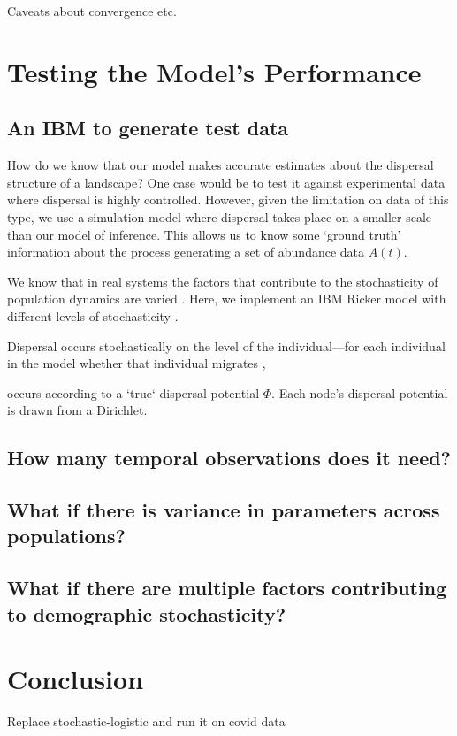 \documentclass[]{article}
\begin{document}
Caveats about convergence etc. 



\section{Testing the Model's Performance}


\subsection{An IBM to generate test data}

How do we know that our model makes accurate estimates about the dispersal structure of a landscape? One case would be to test it against experimental data where dispersal is highly controlled. However, given the limitation on data of this type, we use a simulation model where dispersal takes place on a smaller scale than our model of inference. This allows us to know some `ground truth' information about the process generating a set of abundance data $A(t)$.

We know that in real systems the factors that contribute to the stochasticity of population dynamics are varied \cite{melbourne_2008}.
Here, we implement an IBM Ricker model with different levels of stochasticity \cite{melbourne}. 

Dispersal occurs stochastically on the level of the individual---for each individual in the model whether that individual migrates , 

occurs according to a `true` dispersal potential $\Phi$. Each node's dispersal potential is drawn from a Dirichlet. 


\subsection{How many temporal observations does it need? }

\subsection{What if there is variance in parameters across populations?}

\subsection{What if there are multiple factors contributing to demographic stochasticity?}



\section{Conclusion}

Replace stochastic-logistic and run it on covid data

\clearpage
{
\footnotesize

}
\end{document}
